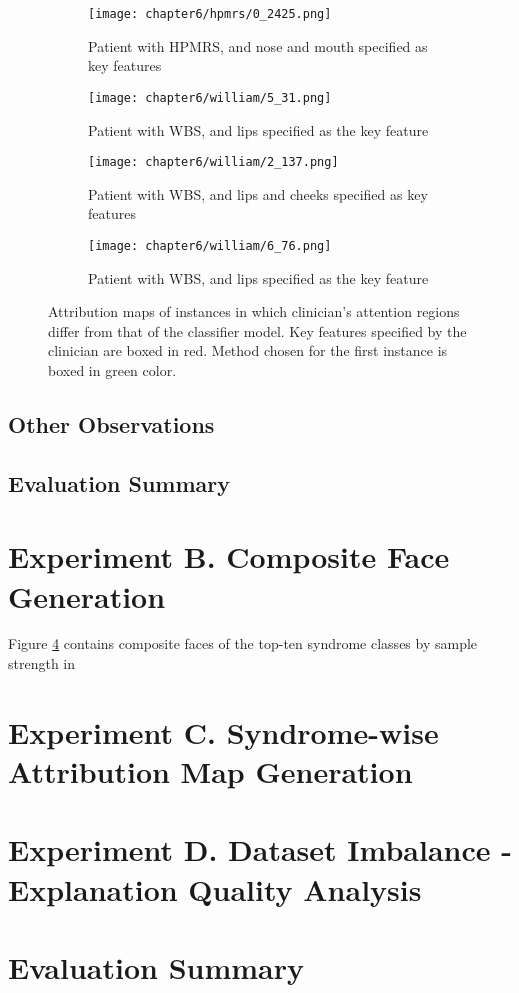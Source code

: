 \documentclass[../report.tex]{subfiles}
\begin{document}
	\begin{figure}[H]
		\begin{subfigure}[t]{1\textwidth}
			\centering
			\texttt{[image: chapter6/hpmrs/0\_2425.png]}
			\caption{Patient with  HPMRS, and nose and mouth specified as key features}
		\end{subfigure}
		\begin{subfigure}[t]{1\textwidth}
			\centering
			\texttt{[image: chapter6/william/5\_31.png]}
			\caption{Patient with  WBS, and lips specified as the key feature}
		\end{subfigure}
		\begin{subfigure}[t]{1\textwidth}
		\centering
		\texttt{[image: chapter6/william/2\_137.png]}
		\caption{Patient with  WBS, and lips and cheeks specified as key features}
		\end{subfigure}
		\begin{subfigure}[t]{1\textwidth}
		\centering
		\texttt{[image: chapter6/william/6\_76.png]}
		\caption{Patient with  WBS, and lips specified as the key feature}
		\end{subfigure}
		\caption[Attribution maps of instances in which clinician's attention regions differ from that of the classifier model]{Attribution maps of instances in which clinician's attention regions differ from that of the classifier model. Key features specified by the clinician are boxed in red. Method chosen for the first instance is boxed in green color.}
	\end{figure}
	
    
    
    \subsection{Other Observations}
    
    
    \subsection{Evaluation Summary}
    
    \section{Experiment B. Composite Face Generation}
    Figure \ref{} contains composite faces of the top-ten syndrome classes by sample strength in 
    
    
    
    
    
    
    
    
    \section{Experiment C. Syndrome-wise Attribution Map Generation}


	\section{Experiment D. Dataset Imbalance - Explanation Quality Analysis}

    \section{Evaluation Summary}
\end{document}
